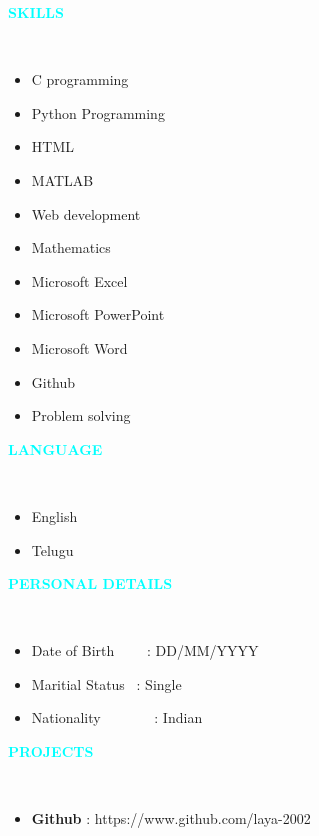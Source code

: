 \documentclass{article}
\begin{document}
\vspace{5mm} 
\textcolor{cyan}{\textbf{SKILLS}}
\hspace{0.5cm}
\\ 
\begin{itemize}
\item C programming
\item Python Programming 
\item HTML 
\item MATLAB 
\item Web development 
\item Mathematics 
\item Microsoft Excel 
\item Microsoft PowerPoint
\item Microsoft Word
\item Github 
\item Problem solving
\end{itemize}
\vspace{5mm} 
\textcolor{cyan}{\textbf{LANGUAGE}}
\hspace{0.5cm} 
\\ 
\begin{itemize} 
\item English 
\item Telugu
\end{itemize} 
\vspace{5mm} 
\textcolor{cyan}{\textbf{PERSONAL DETAILS}}
\hspace{0.5cm} 
\\
\begin{itemize}
\item Date of Birth ~~~~: DD/MM/YYYY
\item Maritial Status ~: Single 
\item Nationality ~~~~~~~: Indian
\end{itemize}
\vspace{5mm} 
\textcolor{cyan}{\textbf{PROJECTS}} 
\hspace{0.5cm} 
\\ 
\begin{itemize}
\item \textbf{Github} : https://www.github.com/laya-2002 
\end{itemize}
\end{document}
